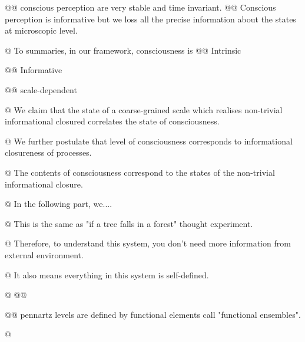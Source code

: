 \documentclass[utf8]{article}
\begin{document}
\begin{WritingMaterials}
    			@@ conscious perception are very stable and time invariant.
    			@@ Conscious perception is informative but we loss all the precise information about the states at microscopic level.        
            
            @ To summaries, in our framework, consciousness is 
    			    @@ Intrinsic 
    			    
    			    @@ Informative  
    			    
    				@@ scale-dependent 
    
    			@ We claim that the state of a coarse-grained scale which realises non-trivial informational closured correlates the state of consciousness.
    
    			@ We further postulate that level of consciousness corresponds to informational closureness of processes.
    
    			@ The contents of consciousness correspond to the states of the non-trivial informational closure.
    
    				
    			@ In the following part, we....
    
    
    			@ This is the same as "if a tree falls in a forest" thought experiment.
    
    			@ Therefore, to understand this system, you don't need more information from external environment.
    
    			@ It also means everything in this system is self-defined.
    			
    			
    			@ 
    				@@ 
    
    				@@ pennartz levels are defined by functional elements call "functional ensembles". \cite{pennartz2017consciousness} 
    
    			@  \cite{pennartz2017consciousness}
                    

\end{WritingMaterials}
\end{document}
